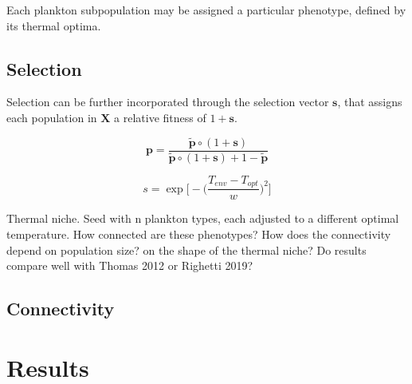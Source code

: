 \documentclass[12pt]{article}
\begin{document}
Each plankton subpopulation may be assigned a particular phenotype, defined by its thermal optima.

\subsection*{Selection}



Selection can be further incorporated through the selection vector $\mathbf{s}$, that assigns each population in $\mathbf{X}$ a relative fitness of $1+\mathbf{s}$.

\begin{equation}
\label{ }
\mathbf{p} = \frac{\mathbf{\tilde{p}} \circ (1+\mathbf{s}) } {\mathbf{\tilde{p}} \circ (1+\mathbf{s}) + 1 -\mathbf{\tilde{p}}}
\end{equation}

\begin{equation}
s = \exp\bigg[-\Big(\frac{T_{env}-T_{opt}}{w}\Big)^2\bigg]
\end{equation}





Thermal niche. Seed with n plankton types, each adjusted to a different optimal temperature. How connected are these phenotypes? How does the connectivity depend on population size? on the shape of the thermal niche? Do results compare well with Thomas 2012 or Righetti 2019?







\subsection{Connectivity}






\section{Results}
\end{document}
